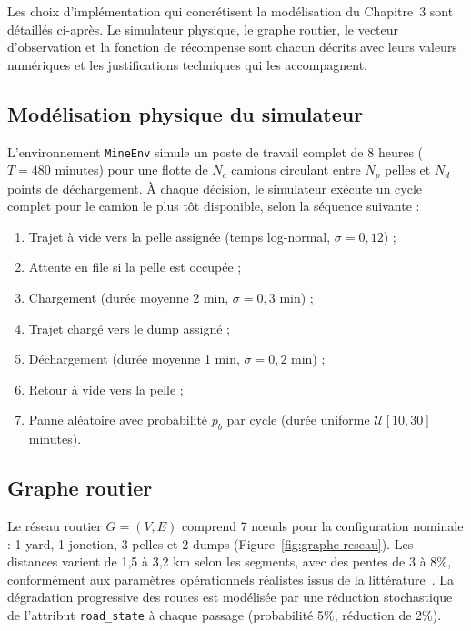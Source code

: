 \documentclass[11pt,a4paper]{report}
\begin{document}
Les choix d'implémentation qui concrétisent la modélisation du Chapitre~3 sont détaillés ci-après. Le simulateur physique, le graphe routier, le vecteur d'observation et la fonction de récompense sont chacun décrits avec leurs valeurs numériques et les justifications techniques qui les accompagnent.

\subsection{Modélisation physique du simulateur}

L'environnement \texttt{MineEnv} simule un poste de travail complet de 8 heures ($T = 480$ minutes) pour une flotte de $N_c$ camions circulant entre $N_p$ pelles et $N_d$ points de déchargement. À chaque décision, le simulateur exécute un cycle complet pour le camion le plus tôt disponible, selon la séquence suivante :

\begin{enumerate}
    \item Trajet à vide vers la pelle assignée (temps log-normal, $\sigma = 0{,}12$) ;
    \item Attente en file si la pelle est occupée ;
    \item Chargement (durée moyenne 2 min, $\sigma = 0{,}3$ min) ;
    \item Trajet chargé vers le dump assigné ;
    \item Déchargement (durée moyenne 1 min, $\sigma = 0{,}2$ min) ;
    \item Retour à vide vers la pelle ;
    \item Panne aléatoire avec probabilité $p_b$ par cycle (durée uniforme $\mathcal{U}[10, 30]$ minutes).
\end{enumerate}

\subsection{Graphe routier}

Le réseau routier $G = (V, E)$ comprend 7 nœuds pour la configuration nominale : 1 yard, 1 jonction, 3 pelles et 2 dumps (Figure~\ref{fig:graphe-reseau}).  Les distances varient de 1{,}5 à 3{,}2 km selon les segments, avec des pentes de 3 à 8\%, conformément aux paramètres opérationnels réalistes issus de la littérature~\cite{Afrapoli2017}.  La dégradation progressive des routes est modélisée par une réduction stochastique de l'attribut \texttt{road\_state} à chaque passage (probabilité 5\%, réduction de 2\%).
\end{document}
